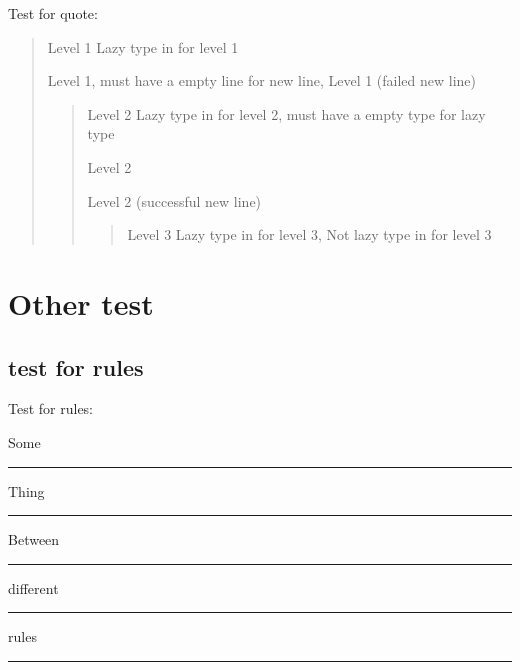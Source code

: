 Test for quote:

\begin{quote}

Level 1
Lazy type in for level 1

Level 1, must have a empty line for new line,
Level 1 (failed new line)

\begin{quote}

Level 2
Lazy type in for level 2, must have a empty type for lazy type

Level 2

Level 2 (successful new line)

\begin{quote}

Level 3
Lazy type in for level 3,
 Not lazy type in for level 3
\end{quote}
\end{quote}
\end{quote}

\newsinglepage

\section{Other test}
\label{set:other}

\subsection{test for rules}
\label{testforrules}

Test for rules:

Some

\begin{center}\rule{3in}{0.4pt}\end{center}


Thing

\begin{center}\rule{3in}{0.4pt}\end{center}


Between

\begin{center}\rule{3in}{0.4pt}\end{center}


different 

\begin{center}\rule{3in}{0.4pt}\end{center}


rules

\begin{center}\rule{3in}{0.4pt}\end{center}


